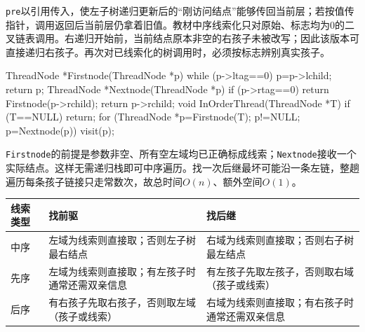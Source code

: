 \texttt{pre}以引用传入，使左子树递归更新后的``刚访问结点''能够传回当前层；若按值传指针，调用返回后当前层仍拿着旧值。教材中序线索化只对原始、标志均为0的二叉链表调用。右递归开始前，当前结点原本非空的右孩子未被改写；因此该版本可直接递归右孩子。再次对已线索化的树调用时，必须按标志辨别真实孩子。

\par\medskip\noindent\begin{minipage}{\linewidth}
\begin{codeblock}[language=C++]
ThreadNode *Firstnode(ThreadNode *p) {
    while (p->ltag==0) p=p->lchild;
    return p;
}
ThreadNode *Nextnode(ThreadNode *p) {
    if (p->rtag==0) return Firstnode(p->rchild);
    return p->rchild;
}
void InOrderThread(ThreadNode *T) {
    if (T==NULL) return;
    for (ThreadNode *p=Firstnode(T); p!=NULL; p=Nextnode(p))
        visit(p);
}
\end{codeblock}
\end{minipage}\par\medskip

\texttt{Firstnode}的前提是参数非空、所有空左域均已正确标成线索；\texttt{Nextnode}接收一个实际结点。这样无需递归栈即可中序遍历。找一次后继最坏可能沿一条左链，整趟遍历每条孩子链接只走常数次，故总时间\(O(n)\)、额外空间\(O(1)\)。

\par\medskip\noindent\begin{minipage}{\linewidth}\fontsize{9.3}{12}\selectfont\begin{tabularx}{\linewidth}{@{}YYY@{}}
\toprule\noalign{}
\begin{minipage}[b]{\linewidth}\raggedright
线索类型
\end{minipage} & \begin{minipage}[b]{\linewidth}\raggedright
找前驱
\end{minipage} & \begin{minipage}[b]{\linewidth}\raggedright
找后继
\end{minipage} \\
\midrule\noalign{}


中序 & 左域为线索则直接取；否则左子树最右结点 & 右域为线索则直接取；否则右子树最左结点 \\
先序 & 左域为线索则直接取；有左孩子时通常还需双亲信息 & 有左孩子先取左孩子，否则取右域（孩子或线索） \\
后序 & 有右孩子先取右孩子，否则取左域（孩子或线索） & 右域为线索则直接取；有右孩子时通常还需双亲信息 \\
\bottomrule\end{tabularx}
\end{minipage}\par\medskip

